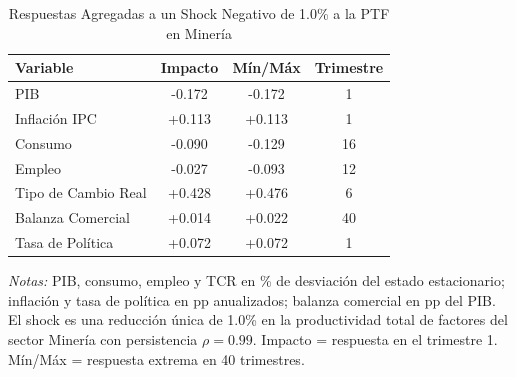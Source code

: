 \begin{table}[htbp]
\centering
\caption{Respuestas Agregadas a un Shock Negativo de 1.0\% a la PTF en Minería}
\label{tab:min_agg}
\begin{threeparttable}
\begin{tabular}{@{}l c c c@{}}
\toprule
Variable & Impacto & Mín/Máx & Trimestre \\
\midrule
PIB & -0.172 & -0.172 & 1 \\
Inflación IPC & +0.113 & +0.113 & 1 \\
Consumo & -0.090 & -0.129 & 16 \\
Empleo & -0.027 & -0.093 & 12 \\
Tipo de Cambio Real & +0.428 & +0.476 & 6 \\
Balanza Comercial & +0.014 & +0.022 & 40 \\
Tasa de Política & +0.072 & +0.072 & 1 \\
\bottomrule
\end{tabular}
\begin{tablenotes}[flushleft]
\footnotesize
\item \textit{Notas:} PIB, consumo, empleo y TCR en \% de desviación del estado estacionario; inflación y tasa de política en pp anualizados; balanza comercial en pp del PIB. El shock es una reducción única de 1.0\% en la productividad total de factores del sector Minería con persistencia $\rho = 0.99$. Impacto = respuesta en el trimestre 1. Mín/Máx = respuesta extrema en 40 trimestres.
\end{tablenotes}
\end{threeparttable}
\end{table}
